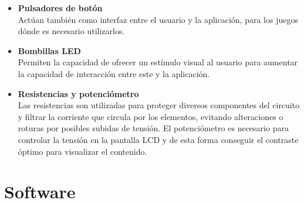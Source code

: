 \begin{itemize}
	\item \textbf{Pulsadores de botón}
	\\
	Actúan también como interfaz entre el usuario y la aplicación, para los juegos dónde es necesario utilizarlos. 
	\item \textbf{Bombillas LED}
	\\
	Permiten la capacidad de ofrecer un estímulo visual al usuario para aumentar la capacidad de interacción entre este y la aplicación.
	
	\item \textbf{Resistencias y potenciómetro}
	\\
    Las resistencias son utilizadas para proteger diversos componentes del circuito y filtrar la corriente que circula por los elementos, evitando alteraciones o roturas por posibles subidas de tensión. El potenciómetro es necesario para controlar la tensión en la pantalla LCD y de esta forma conseguir el contraste óptimo para visualizar el contenido. 
\end{itemize}

\section{Software}
